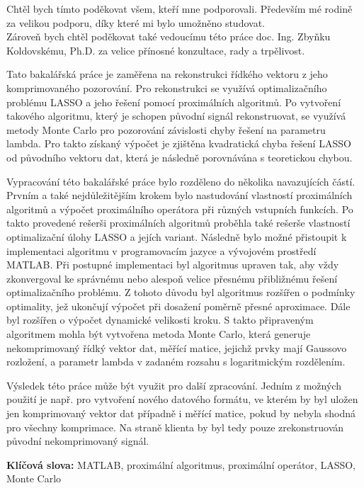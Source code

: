 \documentclass[FM,BP]{tulthesis}
\begin{document}
\begin{acknowledgement}
Chtěl bych tímto poděkovat všem, kteří mne podporovali. Především mé rodině za velikou podporu, díky které mi bylo umožněno studovat. \\ Zároveň bych chtěl poděkovat také vedoucímu této práce doc. Ing. Zbyňku Koldovskému, Ph.D. za velice přínosné konzultace, rady a trpělivost.
\end{acknowledgement}
\clearpage
\begin{abstractCZ}
Tato bakalářská práce je zaměřena na rekonstrukci řídkého vektoru z jeho komprimovaného pozorování. Pro rekonstrukci se využívá optimalizačního problému LASSO a jeho řešení pomocí proximálních algoritmů. Po vytvoření takového algoritmu, který je schopen původní signál rekonstruovat, se využívá metody Monte Carlo pro pozorování závislosti chyby řešení na parametru lambda. Pro takto získaný výpočet je zjištěna kvadratická chyba řešení LASSO od původního vektoru dat, která je následně porovnávána s teoretickou chybou.


Vypracování této bakalářské práce bylo rozděleno do několika navazujících částí. Prvním a také nejdůležitějším krokem bylo nastudování vlastností proximálních algoritmů a výpočet proximálního operátora při různých vstupních funkcích. Po takto provedené rešerši proximálních algoritmů proběhla také rešerše vlastností optimalizační úlohy LASSO a jejích variant. Následně bylo možné přistoupit k implementaci algoritmu v programovacím jazyce a vývojovém prostředí MATLAB. Při postupné implementaci byl algoritmus upraven tak, aby vždy zkonvergoval ke správnému nebo alespoň velice přesnému přibližnému řešení optimalizačního problému. Z tohoto důvodu byl algoritmus rozšířen o podmínky optimality, jež ukončují výpočet při dosažení poměrně přesné aproximace. Dále byl rozšířen o výpočet dynamické velikosti kroku. S takto připraveným algoritmem mohla být vytvořena metoda Monte Carlo, která generuje nekomprimovaný řídký vektor dat, měřící matice, jejichž prvky mají Gaussovo rozložení, a parametr lambda v zadaném rozsahu s logaritmickým rozdělením.    


Výsledek této práce může být využit pro další zpracování. Jedním z možných použití je např. pro vytvoření nového datového formátu, ve kterém by byl uložen jen komprimovaný vektor dat případně i měřící matice, pokud by nebyla shodná pro všechny komprimace. Na straně klienta by byl tedy pouze zrekonstruován původní nekomprimovaný signál.


\textbf{Klíčová slova:} MATLAB, proximální algoritmus, proximální operátor, LASSO, Monte Carlo
\end{abstractCZ}
\end{document}
